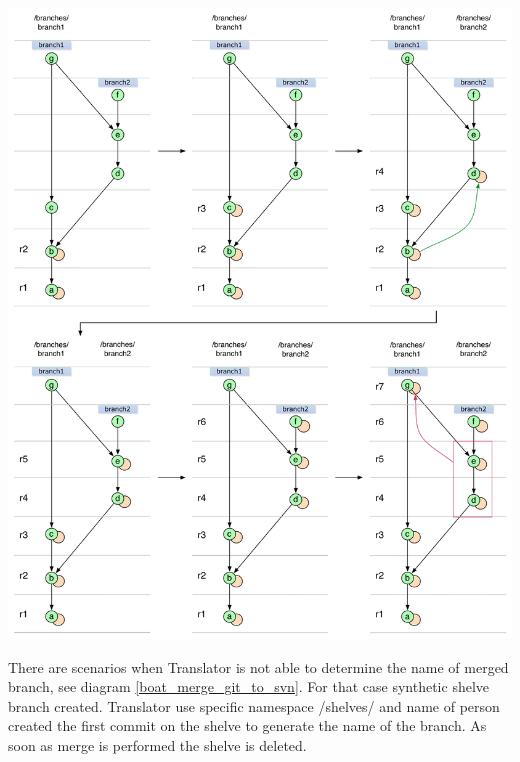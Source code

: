 \begin{center}
\includegraphics[width=\textwidth]{img/diagrams/ml_boat_merge_shelve_is_normal_branch_git_to_svn.pdf}%
\label{boat_merge_shelve_is_normal_branch_git_to_svn}%
\end{center}

There are scenarios when Translator is not able to determine the name of merged branch, see diagram \ref{boat_merge_git_to_svn}. For that case synthetic shelve branch created. Translator use specific namespace /shelves/ and name of person created the first commit on the shelve to generate the name of the branch. As soon as merge is performed the shelve is deleted.

